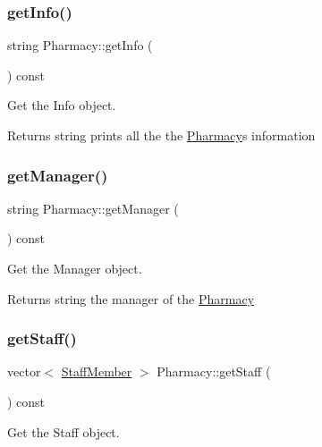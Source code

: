 \subsubsection{\texorpdfstring{get\+Info()}{getInfo()}}
{\footnotesize\ttfamily string Pharmacy\+::get\+Info (\begin{DoxyParamCaption}{ }\end{DoxyParamCaption}) const}



Get the Info object. 

\begin{DoxyReturn}{Returns}
string prints all the the \hyperlink{classPharmacy}{Pharmacy}\textquotesingle{}s information 
\end{DoxyReturn}
\mbox{\label{classPharmacy_acfa4217d82d6276e3e82991fdbb3fd13}} 
\subsubsection{\texorpdfstring{get\+Manager()}{getManager()}}
{\footnotesize\ttfamily string Pharmacy\+::get\+Manager (\begin{DoxyParamCaption}{ }\end{DoxyParamCaption}) const}



Get the Manager object. 

\begin{DoxyReturn}{Returns}
string the manager of the \hyperlink{classPharmacy}{Pharmacy} 
\end{DoxyReturn}
\mbox{\label{classPharmacy_a030c21293a003be529663642a6825590}} 
\subsubsection{\texorpdfstring{get\+Staff()}{getStaff()}}
{\footnotesize\ttfamily vector$<$ \hyperlink{classStaffMember}{Staff\+Member} $>$ Pharmacy\+::get\+Staff (\begin{DoxyParamCaption}{ }\end{DoxyParamCaption}) const}



Get the Staff object. 

